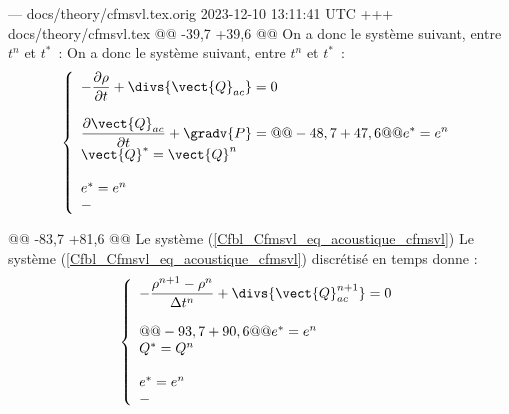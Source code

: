 --- docs/theory/cfmsvl.tex.orig	2023-12-10 13:11:41 UTC
+++ docs/theory/cfmsvl.tex
@@ -39,7 +39,6 @@ On a donc le syst\`eme suivant, entre $t^n$ et $t^*$~:
 On a donc le syst\`eme suivant, entre $t^n$ et $t^*$~:
 \begin{equation}\label{Cfbl_Cfmsvl_eq_acoustique_cfmsvl}
 \left\{\begin{array}{l}
-
 \displaystyle\frac{\partial\rho}{\partial t}+\divs{\vect{Q}_{ac}} = 0 \\
 \\
 \displaystyle\frac{\partial\vect{Q}_{ac}}{\partial t}+\gradv{P} =
@@ -48,7 +47,6 @@ e^*=e^n\\
 \vect{Q}^*=\vect{Q}^n\\
 \\
 e^*=e^n\\
-
 \end{array}\right.
 \end{equation}
 
@@ -83,7 +81,6 @@ Le syst\`eme (\ref{Cfbl_Cfmsvl_eq_acoustique_cfmsvl}) 
 Le syst\`eme (\ref{Cfbl_Cfmsvl_eq_acoustique_cfmsvl}) discr\'etis\'e en temps donne :
 \begin{equation}\label{Cfbl_Cfmsvl_eq_acoustique_discrete_cfmsvl}
 \left\{\begin{array}{l}
-
 \displaystyle\frac{\rho^{n+1}-\rho^n}{\Delta t^n}
 + \divs{\vect{Q}_{ac}^{n+1}} = 0 \\
 \\
@@ -93,7 +90,6 @@ e^*=e^n\\
 Q^*=Q^n\\
 \\
 e^*=e^n\\
-
 \end{array}\right.
 \end{equation}
 
